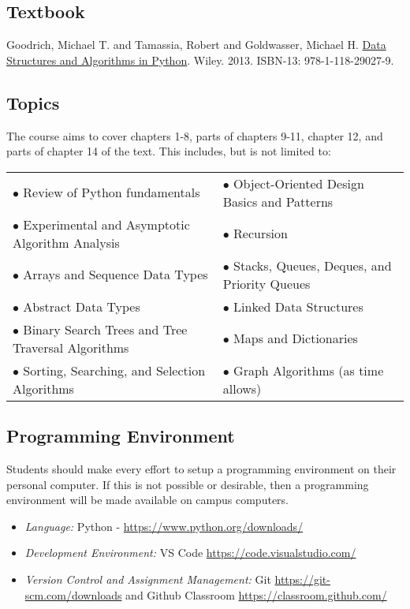 \documentclass[10pt]{article}
\begin{document}
\subsection{Textbook}
\label{sec:orgc3d87e3}

\noindent
Goodrich, Michael T. and Tamassia, Robert and Goldwasser, Michael H. \underline{Data Structures and Algorithms in Python}. Wiley. 2013. ISBN-13: 978-1-118-29027-9.


\subsection{Topics}
\label{sec:org302b48c}
The course aims to cover chapters 1-8, parts of chapters 9-11,
chapter 12, and parts of chapter 14 of the text. This includes, but is
not limited to:

\begin{center}
\begin{tabular}{ll}
\(\bullet\) Review of Python fundamentals & \(\bullet\) Object-Oriented Design Basics and Patterns\\
\(\bullet\) Experimental and Asymptotic Algorithm Analysis & \(\bullet\) Recursion\\
\(\bullet\) Arrays and Sequence Data Types & \(\bullet\) Stacks, Queues, Deques, and Priority Queues\\
\(\bullet\) Abstract Data Types & \(\bullet\) Linked Data Structures\\
\(\bullet\) Binary Search Trees and Tree Traversal Algorithms & \(\bullet\) Maps and Dictionaries\\
\(\bullet\) Sorting, Searching, and Selection Algorithms & \(\bullet\) Graph Algorithms (as time allows)\\
\end{tabular}
\end{center}

\subsection{Programming Environment}
\label{sec:org16c7836}
Students should make every effort to setup a programming environment on their personal computer.  If this is not possible
or desirable, then a programming environment will be made available on campus computers. 

\begin{itemize}
\item \textit{Language:} Python - \url{https://www.python.org/downloads/} 
\item \textit{Development Environment:} VS Code \url{https://code.visualstudio.com/}
\item \textit{Version Control and Assignment Management:} Git \url{https://git-scm.com/downloads} and Github Classroom \url{https://classroom.github.com/}
\end{itemize}
\end{document}
